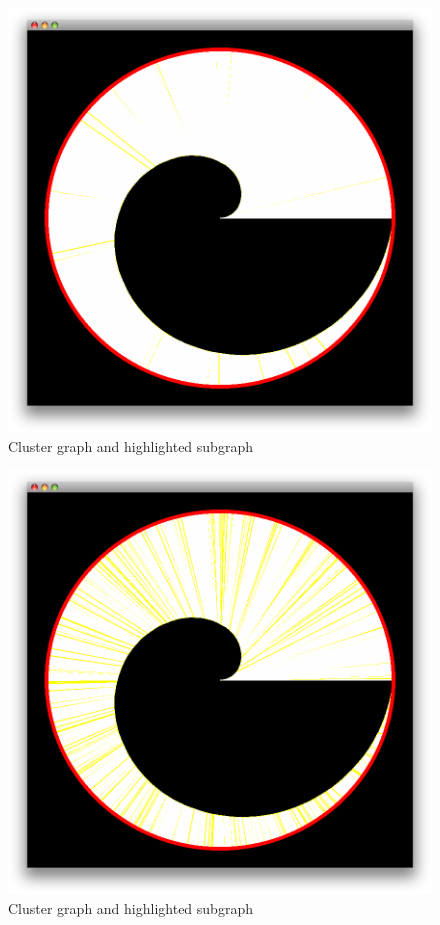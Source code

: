 \documentclass[a4paper,oneside]{article}
\begin{document}
\begin{figure}
\begin{center}
	\includegraphics[scale=0.3]{pictures/cluster_jogl_impl_with_subgraph_1.png}
	\caption{Cluster graph and highlighted subgraph}
	\label{cluster_jogl_impl_with_subgraph_1}
\end{center}
\end{figure}

\begin{figure}
\begin{center}
	\includegraphics[scale=0.3]{pictures/cluster_jogl_impl_with_subgraph_2.png}
	\caption{Cluster graph and highlighted subgraph}
	\label{cluster_jogl_impl_with_subgraph_2}
\end{center}
\end{figure}
\end{document}
